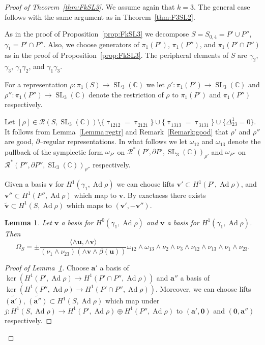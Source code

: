 \documentclass[11pt]{article}
\newtheorem{lemm}[theo]{Lemma}
\theoremstyle{definition}
\numberwithin{equation}{section}
\numberwithin{figure}{section}
\numberwithin{table}{section}
\DeclareMathOperator{\SL}{SL}
\DeclareMathOperator{\Ad}{Ad}
\newcommand*{\zero}{\mathbf{0}}
\newcommand{\Rcal}{\mathcal{R}}
\newcommand{\Cbb}{\mathbb{C}}
\newcommand{\ubf}{\mathbf{u}}
\newcommand{\vbf}{\mathbf{v}}
\newcommand{\abf}{\mathbf{a}}
\begin{document}
\begin{proof}[Proof of Theorem~\ref{thm:FkSL3}]
We assume again that $k=3$. The general case follows with the same argument as in Theorem~\ref{thm:F3SL2}.


As in the proof of Proposition~\ref{prop:FkSL3} we decompose $S=S_{0,4} = P'\cup P''$, $\gamma_1 = P'\cap P''$. Also, we choose generators of $\pi_1(P')$, $\pi_1(P'')$, and $\pi_1(P'\cap P'')$ as in the proof of Proposition~\ref{prop:FkSL3}. The peripheral elements of $S$ are $\gamma_2$, $\gamma_3$, $\gamma_1\gamma_2$, and $\gamma_1\gamma_3$.


For a representation $\rho\colon\pi_1(S)\to\SL_3(\Cbb)$ we let $\rho'\colon\pi_1(P')\to\SL_3(\Cbb)$ and\linebreak $\rho''\colon\pi_1(P'')\to\SL_3(\Cbb)$ denote the restriction of $\rho$ to $\pi_1(P')$ and $\pi_1(P'')$ respectively.


Let $[\rho]\in\Rcal(S,\SL_3(\Cbb))\setminus \{ \uptau_{12\bar 1\bar{2}}= \uptau_{21\bar 2\bar 1} \}\cup
\{ \uptau_{13\bar 1\bar{3}}= \uptau_{31\bar 3\bar 1} \} \cup\{
\varDelta^1_{23} = 0\} $. It follows from Lemma~\ref{Lemma:regtr} and Remark~\ref{Remark:good} that $\rho'$ and $\rho''$ are good, $\partial$--regular representations. In what follows we let $\omega_{12}$ and $\omega_{13}$ denote the pullback of the symplectic form $\omega_{P'}$ on $\Rcal^*(P',\partial P',\SL_3(\Cbb))_{\rho'}$ and $\omega_{P''}$ on $\Rcal^*(P'',\partial P'',\SL_3(\Cbb))_{\rho''}$ respectively.


Given a basis $\vbf$ for $H^1(\gamma_1,\Ad\rho) $ we can choose lifts $\vbf'\subset H^1(P',\Ad\rho) $, and $\vbf''\subset H^1(P'',\Ad\rho) $ which map to $\vbf$. By exactness there exists $\widetilde{\vbf}\subset H^1(S,\Ad\rho)$ which maps to $(\vbf',-\vbf'')$.

\goodbreak

\begin{lemm}\label{lemma:iOmega}
Let $\vbf$ a basis for $H^0(\gamma_1,\Ad\rho) $ and $\vbf$ a basis for $H^1(\gamma_1,\Ad\rho) $. Then
\begin{equation}\label{mult:OmegaS}
\Omega_S =\pm
\frac{\langle \wedge\ubf, \wedge\vbf \rangle }{(\nu_1 \wedge \nu_{23}) (\wedge\vbf\wedge\beta(\ubf)) }
\omega_{12}\wedge \omega_{13} \wedge\nu_2
\wedge\nu_3\wedge\nu_{12}\wedge\nu_{13} \wedge \nu_1\wedge \nu_{23}.
\end{equation}
\end{lemm}

\begin{proof}[Proof of Lemma~\ref{lemma:iOmega}]
Choose $\abf'$ a basis of $\ker (H^1(P',\Ad\rho)\to H^1(P'\cap P'',\Ad\rho))$ and $\abf''$ a basis of $\ker (H^1(P'',\Ad\rho)\to H^1(P'\cap P'',\Ad\rho))$. Moreover, we can choose lifts $\widetilde{(\abf')}$, $\widetilde{(\abf'')}\subset H^1(S,\Ad\rho)$ which map under $j\colon H^1(S,\Ad\rho) \to H^1(P',\Ad\rho)\oplus H^1(P'',\Ad\rho)$ to $(\abf',\zero)$ and $(\zero,\abf'')$ respectively.




\end{proof}
\end{proof}
\end{document}
